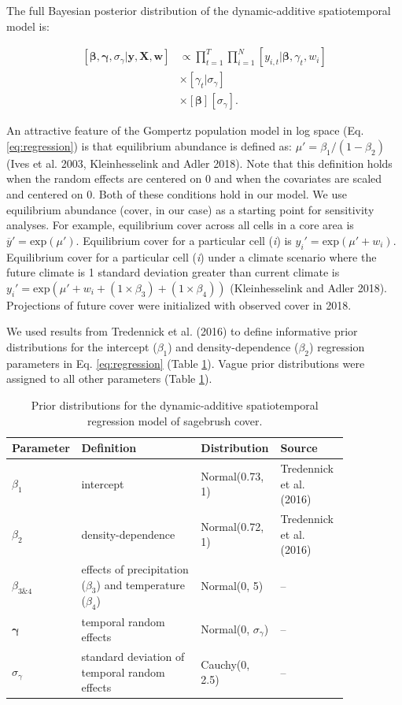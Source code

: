 \documentclass[
  12pt,
]{article}
\begin{document}
The full Bayesian posterior distribution of the dynamic-additive spatiotemporal model is:

\begin{align}
\left[\bm{\beta}, \bm{\gamma}, \sigma_{\gamma} | \textbf{y}, \textbf{X}, \textbf{w} \right] &\propto  \prod^T_{t=1} \prod^N_{i=1} \left[ y_{i,t}| \bm{\beta}, \gamma_t, w_i \right] \nonumber \\
&\times \left[ \gamma_t | \sigma_{\gamma} \right] \nonumber  \\
&\times \left[\bm{\beta}  \right] \left[ \sigma_{\gamma}\right].
\end{align}

An attractive feature of the Gompertz population model in log space (Eq. \ref{eq:regression}) is that equilibrium abundance is defined as: \(\mu' = \beta_1 / \left(1 - \beta_2 \right)\) (Ives et al. 2003, Kleinhesselink and Adler 2018).
Note that this definition holds when the random effects are centered on 0 and when the covariates are scaled and centered on 0.
Both of these conditions hold in our model.
We use equilibrium abundance (cover, in our case) as a starting point for sensitivity analyses.
For example, equilibrium cover across all cells in a core area is \(\overline{y}' = \text{exp}(\mu')\).
Equilibrium cover for a particular cell (\emph{i}) is \(y_i' = \text{exp}(\mu' + w_i)\).
Equilibrium cover for a particular cell (\emph{i}) under a climate scenario where the future climate is 1 standard deviation greater than current climate is \(y_i' = \text{exp}\left(\mu' + w_i + (1\times\beta_3) + (1\times\beta_4) \right)\) (Kleinhesselink and Adler 2018).
Projections of future cover were initialized with observed cover in 2018.

We used results from Tredennick et al. (2016) to define informative prior distributions for the intercept (\(\beta_1\)) and density-dependence (\(\beta_2\)) regression parameters in Eq. \ref{eq:regression} (Table \ref{tab:priors}).
Vague prior distributions were assigned to all other parameters (Table \ref{tab:priors}).

\begin{table}[tbp]
\caption{\label{tab:priors}Prior distributions for the dynamic-additive spatiotemporal regression model of sagebrush cover.}
\small
\begin{tabular}{p{0.1\linewidth}p{0.35\linewidth}p{0.2\linewidth}p{0.2\linewidth}}
\hline
Parameter & Definition & Distribution & Source \\ \hline
$\beta_1$ & intercept  & Normal(0.73, 1) & Tredennick et al. (2016) \\
$\beta_2$ & density-dependence & Normal(0.72, 1) & Tredennick et al. (2016) \\
$\beta_{3\&4}$ & effects of precipitation ($\beta_3$) and temperature ($\beta_4$) & Normal(0, 5) & --  \\ 
$\bm{\gamma}$ & temporal random effects & Normal(0, $\sigma_{\gamma}$) & -- \\
$\sigma_{\gamma}$ & standard deviation of temporal random effects & Cauchy(0, 2.5) & -- \\ \hline
\end{tabular}
\end{table}
\end{document}
